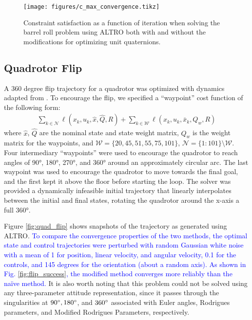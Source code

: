 \documentclass[letterpaper, 10 pt, conference]{ieeeconf}  %
\newcommand{\added}[1]{\textcolor{blue}{#1}}
\begin{document}
        \begin{figure}[t]
            \centering
            \texttt{[image: figures/c\_max\_convergence.tikz]}
            \caption{Constraint satisfaction as a function of iteration when solving the barrel roll problem using ALTRO both with and without the modifications for optimizing unit quaternions.}
            \label{fig:c_max_convergence}
        \end{figure}

    \subsection{Quadrotor Flip}
        A 360 degree flip trajectory for a quadrotor was optimized with dynamics adapted
        from \cite{mellinger2012trajectory}. To encourage the flip, we specified a 
        ``waypoint'' cost function of the following form:
        \begin{multline}
                  \sum_{k \in \mathcal{N}} \ell(x_k, u_k, \hat{x}, \hat{Q}, R) 
                + \sum_{k \in \mathcal{W}} \ell(x_k, u_k, \bar{x}_k, Q_w, R) 
        \end{multline}
        where $\hat{x}$, $\hat{Q}$ are the nominal state and state weight matrix, $Q_w$ is 
        the weight matrix for the waypoints, and
        $\mathcal{W} = \{20,45,51,55,75,101\}$, $\mathcal{N} = \{1:101\} \setminus
        \mathcal{W}$.
        Four intermediary ``waypoints'' were used to encourage the quadrotor
        to reach angles of \ang{90}, \ang{180}, \ang{270}, and \ang{360}
        around an approximately circular arc. The last waypoint was used to
        encourage the quadrotor to move towards the final goal, and the first
        kept it above the floor before starting the loop. The solver was
        provided a dynamically infeasible initial trajectory that linearly
        interpolates between the initial and final states, rotating the
        quadrotor around the x-axis a full \ang{360}.

	    Figure \ref{fig:quad_flip} shows snapshots of the trajectory as
	    generated using ALTRO. \added{To compare the convergence properties of the
	    two methods, the optimal state and control trajectories were
	    perturbed with random Gaussian white noise with a mean of 1 for
	    position, linear velocity, and angular velocity, 0.1 for the
        controls, and 145 degrees for the orientation (about a random axis). 
        As shown in Fig. \ref{fig:flip_success}, the modified method converges
        more reliably than the na\"ive method.}
	    It is also worth noting that this problem could not be solved using
	    any three-parameter attitude representation, since it passes through
	    the singularities at $90\degree, 180\degree$, and $360\degree$
	    associated with Euler angles, Rodrigues parameters, and Modified
	    Rodrigues Parameters, respectively.
\end{document}
